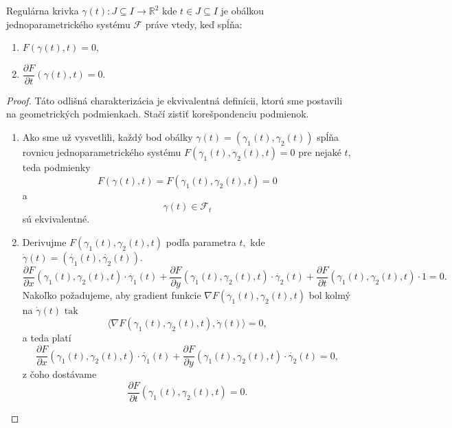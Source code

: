 \begin{theorem}
Regulárna krivka $\gamma(t) \colon J \subseteq I \rightarrow \mathbb{R}^{2}$ kde $t \in J  \subseteq I$ je obálkou jednoparametrického systému $\mathcal{F}$ práve vtedy, keď spĺňa:
\begin{enumerate}
\item $F(\gamma(t), t) = 0, $ 
\item $\dfrac{\partial F}{\partial t}(\gamma(t), t) = 0.$
\end{enumerate}
\end{theorem}

\begin{proof}
Táto odlišná charakterizácia je ekvivalentná definícii, ktorú sme postavili na geometrických podmienkach. Stačí zistiť korešpondenciu podmienok.
\begin{enumerate}
\item Ako sme už vysvetlili, každý bod obálky ${\gamma}(t) = (\gamma_{1}(t),\gamma_{2}(t))$ spĺňa rovnicu jednoparametrického systému $F(\gamma_{1}(t),\gamma_{2}(t),t)=0$ pre nejaké $t,$ teda podmienky 
$$ F(\gamma(t), t) = F(\gamma_{1}(t), \gamma_{2}(t), t) = 0$$
a
$$\gamma(t) \in \mathcal{F}_{t}$$
sú ekvivalentné.
\item Derivujme $F(\gamma_{1}(t),\gamma_{2}(t), t)$ podľa parametra $t,$ kde $ \dot{\gamma}(t) = ( \dot{\gamma_{1}}(t), \dot{\gamma_{2}}(t) ).$
$$ \frac{\partial F}{\partial x}(\gamma_{1}(t),\gamma_{2}(t),t) \cdot \dot{\gamma_{1}}(t)+\frac{\partial F}{\partial y}(\gamma_{1}(t),\gamma_{2}(t),t) \cdot \dot{\gamma_{2}}(t)+\frac{\partial F}{\partial t}(\gamma_{1}(t),\gamma_{2}(t),t) \cdot 1 = 0. $$
Nakoľko požadujeme, aby gradient funkcie $\nabla F(\gamma_{1}(t),\gamma_{2}(t),t)$ bol kolmý na $\dot{\gamma}(t) \text{ tak}$
$$ \langle \nabla F(\gamma_{1}(t),\gamma_{2}(t),t), \dot{\gamma}(t) \rangle = 0,$$
a teda platí
$$ \frac{\partial F}{\partial x}(\gamma_{1}(t),\gamma_{2}(t),t) \cdot \dot{\gamma_{1}}(t)+\frac{\partial F}{\partial y}(\gamma_{1}(t),\gamma_{2}(t),t) \cdot \dot{\gamma_{2}}(t) = 0, $$
z čoho dostávame
$$ \frac{\partial F}{\partial t}(\gamma_{1}(t),\gamma_{2}(t),t) = 0. $$ 
\end{enumerate}
\end{proof}


